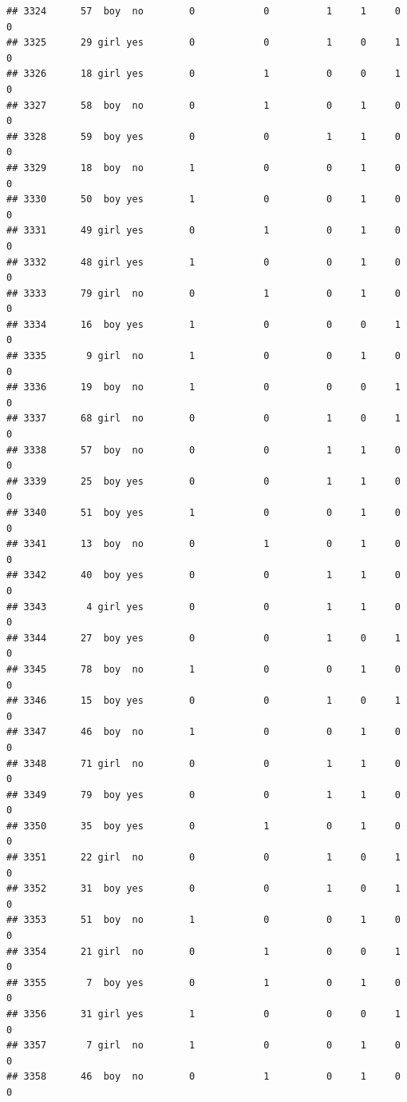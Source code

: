 \documentclass[man]{apa6}
\begin{document}
\begin{verbatim}
## 3324      57  boy  no        0            0          1     1     0     0
## 3325      29 girl yes        0            0          1     0     1     0
## 3326      18 girl yes        0            1          0     0     1     0
## 3327      58  boy  no        0            1          0     1     0     0
## 3328      59  boy yes        0            0          1     1     0     0
## 3329      18  boy  no        1            0          0     1     0     0
## 3330      50  boy yes        1            0          0     1     0     0
## 3331      49 girl yes        0            1          0     1     0     0
## 3332      48 girl yes        1            0          0     1     0     0
## 3333      79 girl  no        0            1          0     1     0     0
## 3334      16  boy yes        1            0          0     0     1     0
## 3335       9 girl  no        1            0          0     1     0     0
## 3336      19  boy  no        1            0          0     0     1     0
## 3337      68 girl  no        0            0          1     0     1     0
## 3338      57  boy  no        0            0          1     1     0     0
## 3339      25  boy yes        0            0          1     1     0     0
## 3340      51  boy yes        1            0          0     1     0     0
## 3341      13  boy  no        0            1          0     1     0     0
## 3342      40  boy yes        0            0          1     1     0     0
## 3343       4 girl yes        0            0          1     1     0     0
## 3344      27  boy yes        0            0          1     0     1     0
## 3345      78  boy  no        1            0          0     1     0     0
## 3346      15  boy yes        0            0          1     0     1     0
## 3347      46  boy  no        1            0          0     1     0     0
## 3348      71 girl  no        0            0          1     1     0     0
## 3349      79  boy yes        0            0          1     1     0     0
## 3350      35  boy yes        0            1          0     1     0     0
## 3351      22 girl  no        0            0          1     0     1     0
## 3352      31  boy yes        0            0          1     0     1     0
## 3353      51  boy  no        1            0          0     1     0     0
## 3354      21 girl  no        0            1          0     0     1     0
## 3355       7  boy yes        0            1          0     1     0     0
## 3356      31 girl yes        1            0          0     0     1     0
## 3357       7 girl  no        1            0          0     1     0     0
## 3358      46  boy  no        0            1          0     1     0     0

\end{verbatim}
\end{document}
